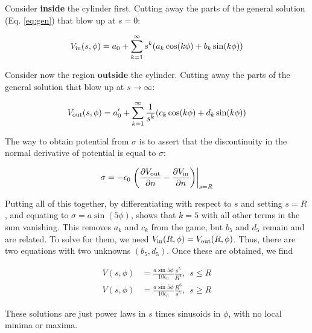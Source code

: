 \documentclass[10pt]{article}
\begin{document}
Consider \textbf{inside} the cylinder first.  Cutting away the parts of the general solution (Eq. \ref{eq:gen}) that blow up at $s = 0$:

\begin{equation}
V_{\rm in} (s,\phi) = a_0 + \sum_{k=1}^{\infty} s^k (a_k \cos(k\phi)+ b_k \sin(k\phi) )
\end{equation}

Consider now the region \textbf{outside} the cylinder.  Cutting away the parts of the general solution that blow up at $s \to \infty$:

\begin{equation}
V_{\rm out} (s,\phi) = a'_0 + \sum_{k=1}^{\infty} \frac{1}{s^k} (c_k \cos(k\phi)+ d_k \sin(k\phi) )
\end{equation}

The way to obtain potential from $\sigma$ is to assert that the discontinuity in the normal derivative of potential is equal to $\sigma$:

\begin{equation}
\sigma = -\epsilon_0 \left.\left( \frac{\partial V_{\rm out}}{\partial n} - \frac{\partial V_{\rm in}}{\partial n}\right)\right|_{s = R}
\end{equation}

Putting all of this together, by differentiating with respect to $s$ and setting $s = R$, and equating to $\sigma = a\sin(5\phi)$, shows that $k = 5$ with all other terms in the sum vanishing.  This removes $a_k$ and $c_k$ from the game, but $b_5$ and $d_5$ remain and are related.  To solve for them, we need $V_{\rm in}(R,\phi) = V_{\rm out}(R,\phi)$.  Thus, there are two equations with two unknowns $(b_5,d_5)$.  Once these are obtained, we find

\begin{align}
V(s,\phi) &= \frac{a\sin 5\phi}{10\epsilon_0}\frac{s^5}{R^4}, ~~ s \leq R \\
V(s,\phi) &= \frac{a\sin 5\phi}{10\epsilon_0}\frac{R^6}{s^5}, ~~ s \geq R
\end{align}

These solutions are just power laws in $s$ times sinusoids in $\phi$, with no local minima or maxima.
\end{document}
